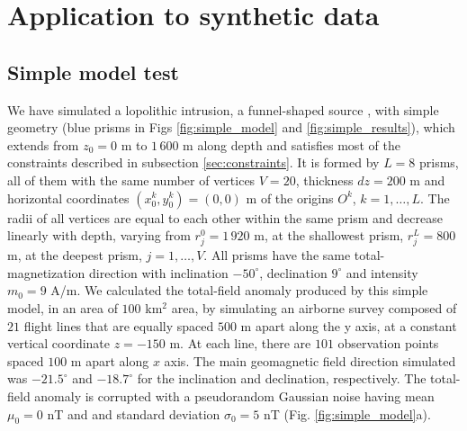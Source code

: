 \section{Application to synthetic data}\label{sec:synthetic}

\subsection{Simple model test}

We have simulated a lopolithic intrusion, a funnel-shaped source \cite[]{cawthorn-2018}, with simple geometry (blue prisms in Figs \ref{fig:simple_model} and \ref{fig:simple_results}), which extends from $z_0=0$ m to $1\,600$ m along depth and satisfies most of the constraints described in subsection \ref{sec:constraints}. It is formed by $L=8$ prisms, all of them with the same number of vertices $ V = 20 $, thickness $ dz = 200 $ m and horizontal coordinates $ (x_0^k, y_0^k) = (0, 0) $ m of the origins $O^k$, $k=1,\dots,L$. The radii of all vertices are equal to each other within the same prism and decrease linearly with depth, varying from $r_j^0=1\,920$ m, at the shallowest prism, $r_j^L=800$ m, at the deepest prism, $j=1,\dots, V$. All prisms have the same total-magnetization direction with inclination $ -50^\circ $, declination $ 9^\circ $ and intensity $ m_0 = 9 $ A/m. We calculated the total-field anomaly produced by this simple model, in an area of $ 100 $ km$^2$ area, by simulating an airborne survey composed of $ 21 $ flight lines that are equally spaced $ 500 $ m apart along the y axis, at a constant vertical coordinate $ z = -150 $ m. At each line, there are $ 101 $ observation points spaced $100$ m apart along $ x $ axis. 
The main geomagnetic field direction simulated was  $ -21.5^\circ $ and  $ -18.7^\circ $ for the inclination and declination, respectively. 
The total-field anomaly is corrupted with a pseudorandom Gaussian noise having mean $ \mu_0=0 $ nT and and standard deviation $ \sigma_0 = 5 $ nT (Fig. \ref{fig:simple_model}a).


